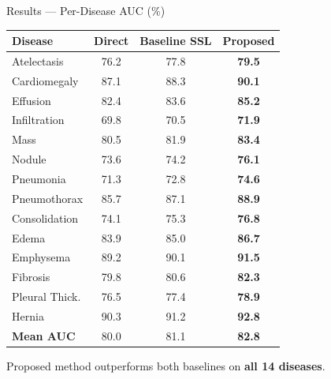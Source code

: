 \documentclass{beamer}
\begin{document}
\begin{frame}{Results --- Per-Disease AUC (\%)}
\begin{table}
\centering
\footnotesize
\begin{tabular}{@{}lccc@{}}
\toprule
\textbf{Disease} & \textbf{Direct} & \textbf{Baseline SSL} & \textbf{Proposed} \\
\midrule
Atelectasis      & 76.2 & 77.8 & \textbf{79.5} \\
Cardiomegaly     & 87.1 & 88.3 & \textbf{90.1} \\
Effusion         & 82.4 & 83.6 & \textbf{85.2} \\
Infiltration     & 69.8 & 70.5 & \textbf{71.9} \\
Mass             & 80.5 & 81.9 & \textbf{83.4} \\
Nodule           & 73.6 & 74.2 & \textbf{76.1} \\
Pneumonia        & 71.3 & 72.8 & \textbf{74.6} \\
Pneumothorax     & 85.7 & 87.1 & \textbf{88.9} \\
Consolidation    & 74.1 & 75.3 & \textbf{76.8} \\
Edema            & 83.9 & 85.0 & \textbf{86.7} \\
Emphysema        & 89.2 & 90.1 & \textbf{91.5} \\
Fibrosis         & 79.8 & 80.6 & \textbf{82.3} \\
Pleural Thick.   & 76.5 & 77.4 & \textbf{78.9} \\
Hernia           & 90.3 & 91.2 & \textbf{92.8} \\
\midrule
\textbf{Mean AUC} & 80.0 & 81.1 & \textbf{82.8} \\
\bottomrule
\end{tabular}
\end{table}
\centering
\small Proposed method outperforms both baselines on \textbf{all 14 diseases}.
\end{frame}
\end{document}
